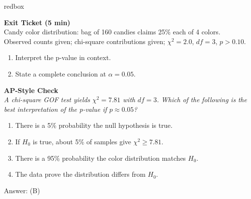 \documentclass[10pt]{article}
\begin{document}
\begin{skillbox}{redbox}
\begin{minipage}[t]{0.48\linewidth}
    \textbf{Exit Ticket (5 min)}\\
    Candy color distribution: bag of 160 candies claims 25\% each of 4 colors.
    Observed counts given; chi-square contributions given; $\chi^2 = 2.0$,
    $df = 3$, $p > 0.10$.
    \begin{enumerate}
        \item Interpret the p-value in context.
        \item State a complete conclusion at $\alpha = 0.05$.
    \end{enumerate}
\end{minipage}
\hfill
\begin{minipage}[t]{0.48\linewidth}
    \textbf{AP-Style Check}\\
    \textit{A chi-square GOF test yields $\chi^2 = 7.81$ with $df = 3$.
    Which of the following is the best interpretation of the p-value
    if $p \approx 0.05$?}
    \begin{enumerate}[label=(\Alph*)]
        \item There is a 5\% probability the null hypothesis is true.
        \item If $H_0$ is true, about 5\% of samples give $\chi^2 \ge 7.81$.
        \item There is a 95\% probability the color distribution matches $H_0$.
        \item The data prove the distribution differs from $H_0$.
    \end{enumerate}
    Answer: (B)
\end{minipage}
\end{skillbox}
\end{document}
